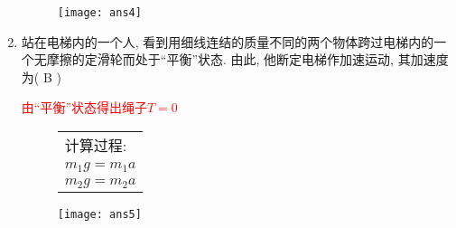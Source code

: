 \begin{enumerate}
\begin{note}
\begin{figure}[ht]
\begin{minipage}[ht]{0.6\linewidth}
\begin{table}[H]
                \end{table}  
            \end{minipage}
            \begin{minipage}[H]{0.3\linewidth}
                \texttt{[image: ans4]}
            \end{minipage}
        \end{figure}
    \end{note}
\item 站在电梯内的一个人, 看到用细线连结的质量不同的两个物体跨过电梯内的一个无摩擦的定滑轮而处于“平衡”状态. 由此, 他断定电梯作加速运动, 其加速度为( B )
\begin{note}
    \textcolor{red}{由“平衡”状态得出绳子$T=0$}
    \begin{figure}[ht]
        \begin{minipage}[ht]{0.6\linewidth}
            \begin{table}[H]
                \begin{tabular}{l}
                   \qquad 计算过程:\\
                   \qquad \qquad $m_1 g = m_1a$ \\
                   \qquad \qquad $m_2 g = m_2a$ \\
                \end{tabular}
            \end{table}  
        \end{minipage}
        \begin{minipage}[H]{0.3\linewidth}
            \texttt{[image: ans5]}
        \end{minipage}
    \end{figure}
\end{note}
\end{enumerate}


